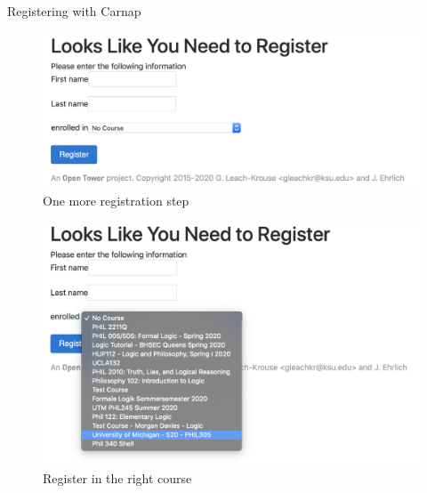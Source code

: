 \documentclass[ignorenonframetext,]{beamer}
\renewcommand{\,}{\text{, }}
\begin{document}
\begin{frame}{Registering with Carnap}
\protect\hypertarget{registering-with-carnap}{}

\begin{figure}
\centering
\includegraphics[width=\textwidth,height=0.8\textheight]{images/0_1_a_Carnap_Need_Register.png}
\caption{One more registration step}
\end{figure}

\end{frame}

\begin{frame}

\begin{figure}
\centering
\includegraphics[width=\textwidth,height=0.8\textheight]{images/0_1_a_Registration.png}
\caption{Register in the right course}
\end{figure}

\end{frame}
\end{document}
